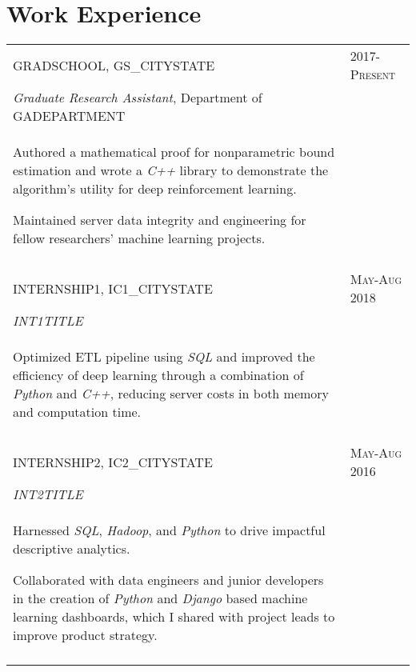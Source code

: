 \documentclass[a4paper,10pt]{article}
\begin{document}
\section{Work Experience}
\begin{supertabular}{p{13.9cm}>{\raggedleft\arraybackslash}p{3.4cm}}
	\textsc{GRADSCHOOL}, GS_CITYSTATE
	& \textsc{2017-Present} \\

	\small	\emph{Graduate Research Assistant}, \small Department of GADEPARTMENT & \\
	\begin{enumerate*}[label =$\circ$,itemjoin={\newline}]
		\item \footnotesize Authored a mathematical proof for nonparametric bound estimation and wrote a \emph{C++} library to demonstrate the algorithm's utility for deep reinforcement learning. 
		\item \footnotesize Maintained server data integrity and engineering for fellow researchers' machine learning projects.
	\end{enumerate*} & \\ 


	 \\

	\textsc{INTERNSHIP1}, IC1_CITYSTATE 
	& \textsc{May-Aug 2018} \\
	\small	\emph{INT1TITLE} & \\
	\begin{enumerate*}[label =$\circ$, itemjoin={\newline}]
		\item \footnotesize Optimized ETL pipeline using \emph{SQL} and improved the efficiency of deep learning through a combination of \emph{Python} and \emph{C++}, reducing server costs in both memory and computation time.
	\end{enumerate*} & \\
	 \\
	



	\textsc{INTERNSHIP2}, IC2_CITYSTATE 
	& \textsc{May-Aug 2016} \\
	\small	\emph{INT2TITLE} & \\
	\begin{enumerate*}[label =$\circ$, itemjoin={\newline}]
		\item \footnotesize Harnessed \emph{SQL}, \emph{Hadoop}, and \emph{Python} to drive impactful descriptive analytics.
		\item \footnotesize Collaborated with data engineers and junior developers in the creation of \emph{Python} and \emph{Django} based machine learning dashboards, which I shared with project leads to improve product strategy.
	\end{enumerate*} & \\
	 \\
	



\end{supertabular}
\end{document}
